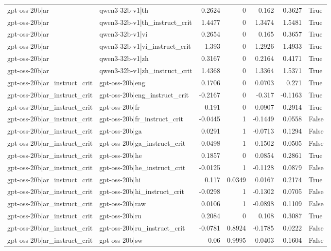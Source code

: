 \begin{table}
\begin{tabular}{l l r r r r l}
gpt-oss-20b|ar & qwen3-32b-v1|th & 0.2624 & 0 & 0.162 & 0.3627 & True \\
gpt-oss-20b|ar & qwen3-32b-v1|th_instruct_crit & 1.4477 & 0 & 1.3474 & 1.5481 & True \\
gpt-oss-20b|ar & qwen3-32b-v1|vi & 0.2654 & 0 & 0.165 & 0.3657 & True \\
gpt-oss-20b|ar & qwen3-32b-v1|vi_instruct_crit & 1.393 & 0 & 1.2926 & 1.4933 & True \\
gpt-oss-20b|ar & qwen3-32b-v1|zh & 0.3167 & 0 & 0.2164 & 0.4171 & True \\
gpt-oss-20b|ar & qwen3-32b-v1|zh_instruct_crit & 1.4368 & 0 & 1.3364 & 1.5371 & True \\
gpt-oss-20b|ar_instruct_crit & gpt-oss-20b|eng & 0.1706 & 0 & 0.0703 & 0.271 & True \\
gpt-oss-20b|ar_instruct_crit & gpt-oss-20b|eng_instruct_crit & -0.2167 & 0 & -0.317 & -0.1163 & True \\
gpt-oss-20b|ar_instruct_crit & gpt-oss-20b|fr & 0.191 & 0 & 0.0907 & 0.2914 & True \\
gpt-oss-20b|ar_instruct_crit & gpt-oss-20b|fr_instruct_crit & -0.0445 & 1 & -0.1449 & 0.0558 & False \\
gpt-oss-20b|ar_instruct_crit & gpt-oss-20b|ga & 0.0291 & 1 & -0.0713 & 0.1294 & False \\
gpt-oss-20b|ar_instruct_crit & gpt-oss-20b|ga_instruct_crit & -0.0498 & 1 & -0.1502 & 0.0505 & False \\
gpt-oss-20b|ar_instruct_crit & gpt-oss-20b|he & 0.1857 & 0 & 0.0854 & 0.2861 & True \\
gpt-oss-20b|ar_instruct_crit & gpt-oss-20b|he_instruct_crit & -0.0125 & 1 & -0.1128 & 0.0879 & False \\
gpt-oss-20b|ar_instruct_crit & gpt-oss-20b|hi & 0.117 & 0.0349 & 0.0167 & 0.2174 & True \\
gpt-oss-20b|ar_instruct_crit & gpt-oss-20b|hi_instruct_crit & -0.0298 & 1 & -0.1302 & 0.0705 & False \\
gpt-oss-20b|ar_instruct_crit & gpt-oss-20b|raw & 0.0106 & 1 & -0.0898 & 0.1109 & False \\
gpt-oss-20b|ar_instruct_crit & gpt-oss-20b|ru & 0.2084 & 0 & 0.108 & 0.3087 & True \\
gpt-oss-20b|ar_instruct_crit & gpt-oss-20b|ru_instruct_crit & -0.0781 & 0.8924 & -0.1785 & 0.0222 & False \\
gpt-oss-20b|ar_instruct_crit & gpt-oss-20b|sw & 0.06 & 0.9995 & -0.0403 & 0.1604 & False \\

\end{tabular}
\end{table}
